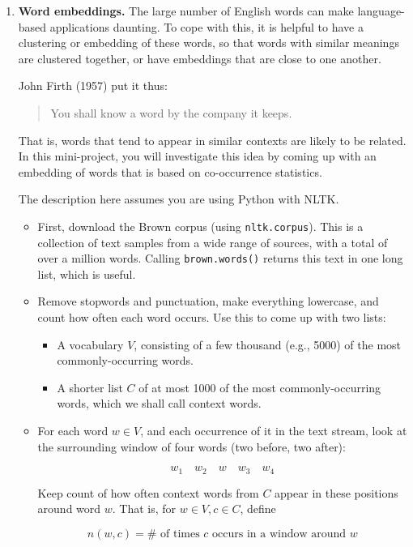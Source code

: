 \documentclass{article}
\begin{document}
\begin{enumerate}[resume]
\item \textbf{Word embeddings.} The large number of English words can make language-based applications daunting. To cope with this, it is helpful to have a clustering or embedding of these words, so that words with similar meanings are clustered together, or have embeddings that are close to one another.

John Firth (1957) put it thus:
\begin{quote}
You shall know a word by the company it keeps.
\end{quote}
That is, words that tend to appear in similar contexts are likely to be related. In this mini-project, you will investigate this idea by coming up with an embedding of words that is based on co-occurrence statistics.

The description here assumes you are using Python with NLTK.

\begin{itemize}
\item First, download the Brown corpus (using \texttt{nltk.corpus}). This is a collection of text samples from a wide range of sources, with a total of over a million words. Calling \texttt{brown.words()} returns this text in one long list, which is useful.

\item Remove stopwords and punctuation, make everything lowercase, and count how often each word occurs. Use this to come up with two lists:
\begin{itemize}
\item A vocabulary $V$, consisting of a few thousand (e.g., 5000) of the most commonly-occurring words.
\item A shorter list $C$ of at most 1000 of the most commonly-occurring words, which we shall call context words.
\end{itemize}

\item For each word $w \in V$, and each occurrence of it in the text stream, look at the surrounding window of four words (two before, two after):

\[
w_1 \quad w_2 \quad w \quad w_3 \quad w_4
\]

Keep count of how often context words from $C$ appear in these positions around word $w$. That is, for $w \in V, c \in C$, define

\[
n(w, c) = \# \text{ of times } c \text{ occurs in a window around } w
\]


\end{itemize}
\end{enumerate}
\end{document}
